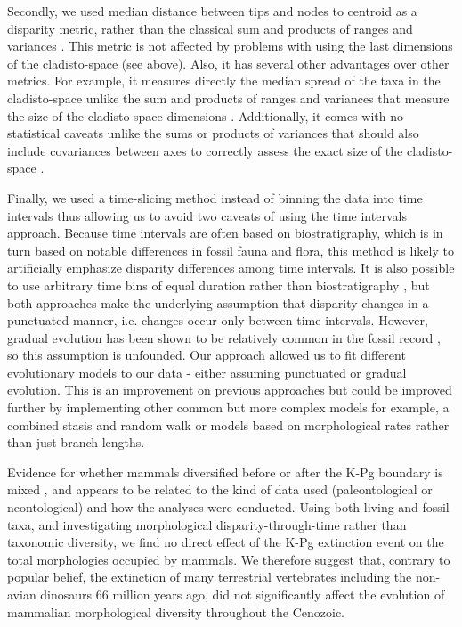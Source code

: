 \documentclass[12pt,letterpaper]{article}
\renewcommand{\subsection}[1]{%
\bigskip
\begin{center}
\begin{large}
\normalfont\itshape #1
\end{large}
\end{center}}
\begin{document}
Secondly, we used median distance between tips and nodes to centroid as a disparity metric, rather than the classical sum and products of ranges and variances \citep{Wills1994}.
This metric is not affected by problems with using the last dimensions of the cladisto-space (see above).
Also, it has several other advantages over other metrics.
For example, it measures directly the median spread of the taxa in the cladisto-space unlike the sum and products of ranges and variances that measure the size of the cladisto-space dimensions \citep{Wills1994}.
Additionally, it comes with no statistical caveats unlike the sums or products of variances that should also include covariances between axes to correctly assess the exact size of the cladisto-space \citep[even though the covariance term is usually close to 0 because of the eigen decomposition;][]{GOWER01121966}.

Finally, we used a time-slicing method instead of binning the data into time intervals \citep[e.g in:][]{cisneros2010,prentice2011,Hughes20082013,hopkinsdecoupling2013,bentonmodels2014,bensonfaunal2014} thus allowing us to avoid two caveats of using the time intervals approach.
Because time intervals are often based on biostratigraphy, which is in turn based on notable differences in fossil fauna and flora, this method is likely to artificially emphasize disparity differences among time intervals.
It is also possible to use arbitrary time bins of equal duration rather than biostratigraphy \citep{Butler2012,hopkinsdecoupling2013,bensonfaunal2014}, but both approaches make the underlying assumption that disparity changes in a punctuated  manner, i.e. changes occur only between time intervals.
However, gradual evolution has been shown to be relatively common in the fossil record \citep{Hunt20112007,Hunt21042015}, so this assumption is unfounded.
Our approach allowed us to fit different evolutionary models to our data - either assuming punctuated or gradual evolution.
This is an improvement on previous approaches but could be improved further by implementing other common but more complex models for example, a combined stasis and random walk \citep{Hunt21042015} or models based on morphological rates rather than just branch lengths.

Evidence for whether mammals diversified before or after the K-Pg boundary is mixed \citep{meredithimpacts2011,OLeary08022013,dosReis2014,beckancient2014}, and appears to be related to the kind of data used (paleontological or neontological) and how the analyses were conducted.
Using both living and fossil taxa, and investigating morphological disparity-through-time rather than taxonomic diversity, we find no direct effect of the K-Pg extinction event on the total morphologies occupied by mammals. 
We therefore suggest that, contrary to popular belief, the extinction of many terrestrial vertebrates including the non-avian dinosaurs 66 million years ago, did not significantly affect the evolution of mammalian morphological diversity throughout the Cenozoic.
\end{document}
